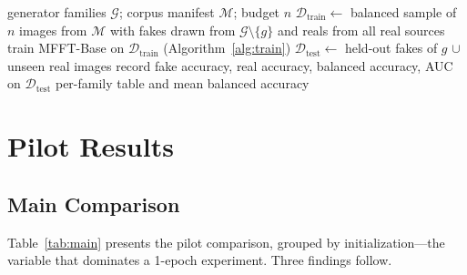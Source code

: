 \documentclass[journal]{IEEEtran}
\begin{document}
\begin{algorithm}[!t]
\caption{Leave-one-generator-out (LOGO) evaluation}
\label{alg:logo}
\begin{algorithmic}[1]
\REQUIRE generator families $\mathcal{G}$; corpus manifest $\mathcal{M}$; budget $n$
    \STATE $\mathcal{D}_{\mathrm{train}} \leftarrow$ balanced sample of $n$ images from $\mathcal{M}$ with fakes drawn from $\mathcal{G} \setminus \{g\}$ and reals from all real sources
    \STATE train MFFT-Base on $\mathcal{D}_{\mathrm{train}}$ (Algorithm~\ref{alg:train})
    \STATE $\mathcal{D}_{\mathrm{test}} \leftarrow$ held-out fakes of $g$ $\cup$ unseen real images
    \STATE record fake accuracy, real accuracy, balanced accuracy, AUC on $\mathcal{D}_{\mathrm{test}}$
\ENDFOR
\RETURN per-family table and mean balanced accuracy
\end{algorithmic}
\end{algorithm}

\section{Pilot Results}
\label{sec:results}

\subsection{Main Comparison}
\label{sec:main}
Table~\ref{tab:main} presents the pilot comparison, grouped by initialization---the variable that dominates a 1-epoch experiment. Three findings follow.
\end{document}
